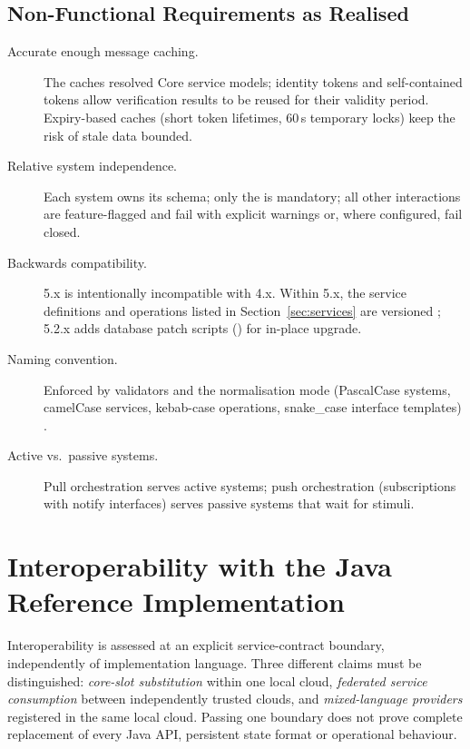 \documentclass[a4paper]{arrowhead}
\newcommand{\sys}[1]{\textcolor{ArrowheadBlue}{\textbf{\ahbreak{#1}}}}      %
\begin{document}
\subsection{Non-Functional Requirements as Realised}
\label{sec:nfr}

\begin{description}
  \item[Accurate enough message caching.] The  caches resolved Core
        service models; identity tokens and self-contained tokens allow verification
        results to be reused for their validity period. Expiry-based caches (short token
        lifetimes, 60\,s temporary locks) keep the risk of stale data bounded.
  \item[Relative system independence.] Each system owns its schema; only the
        \sys{ServiceRegistry} is mandatory; all other interactions are feature-flagged and
        fail with explicit warnings or, where configured, fail closed.
  \item[Backwards compatibility.] 5.x is intentionally incompatible with 4.x. Within 5.x, the
        service definitions and operations listed in Section~\ref{sec:services} are versioned
        ; 5.2.x adds database patch scripts () for
        in-place upgrade.
  \item[Naming convention.] Enforced by validators and the  normalisation mode
        (PascalCase systems, camelCase services, kebab-case operations, snake\_case
        interface templates) \cite{naming2}.
  \item[Active vs.\ passive systems.] Pull orchestration serves active systems; push
        orchestration (subscriptions with notify interfaces) serves passive systems that
        wait for stimuli.
\end{description}



\newpage

\FloatBarrier
\section{Interoperability with the Java Reference Implementation}
\label{sec:interop}
Interoperability is assessed at an explicit service-contract boundary, independently
of implementation language. Three different claims must be distinguished:
\emph{core-slot substitution} within one local cloud, \emph{federated service
consumption} between independently trusted clouds, and \emph{mixed-language
providers} registered in the same local cloud. Passing one boundary does not prove
complete replacement of every Java API, persistent state format or operational behaviour.
\end{document}
